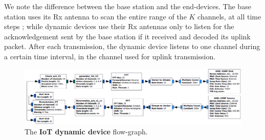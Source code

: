 We note the difference between the base station and the end-devices.
The base station uses its Rx antenna to scan the entire range of the $K$ channels, at all time steps ; while dynamic devices use their Rx antennas only to listen for the acknowledgement sent by the base station if it received and decoded its uplink packet.
After each transmission, the dynamic device listens to one channel during a certain time interval, in the channel used for uplink transmission.

\begin{figure}[!h]
    \includegraphics[width=1.00\textwidth]{2-Chapters/4-Chapter/Images/USRP_TX_SU__v1__simple_grc.png}
    \caption{The \textbf{IoT dynamic device} flow-graph.}
    \label{fig:4app:USRP_TX_SU__v1__simple_grc}
\end{figure}
